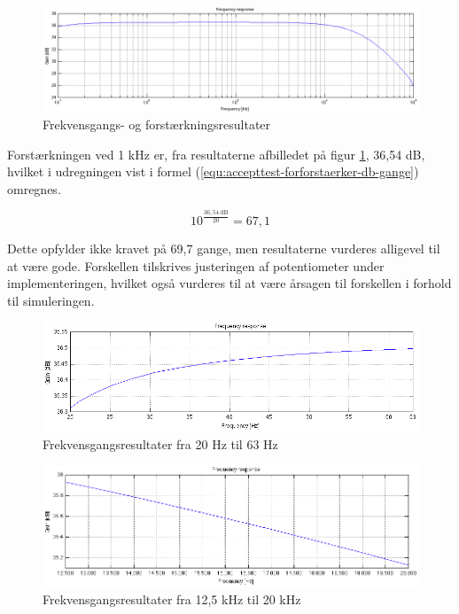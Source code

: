 \begin{figure}[h]
\centering
\includegraphics[width=\textwidth]{maalerapporter/forforstaerker/frekvensrespons-forforstaerker.png}
\caption{Frekvensgangs- og forstærkningsresultater}
\label{fig:accepttest-fresultat-forforstaerker}
\end{figure}

Forstærkningen ved 1 kHz er, fra resultaterne afbilledet på figur \ref{fig:accepttest-fresultat-forforstaerker}, 36,54 dB, hvilket i udregningen vist i formel (\ref{equ:accepttest-forforstaerker-db-gange}) omregnes.

\begin{equation}
\label{equ:accepttest-forforstaerker-db-gange}
10^{\frac{\mathrm{36,54~dB}}{20}} = 67,1
\end{equation}

Dette opfylder ikke kravet på 69,7 gange, men resultaterne vurderes alligevel til at være gode. Forskellen tilskrives justeringen af potentiometer under implementeringen, hvilket også vurderes til at være årsagen til forskellen i forhold til simuleringen. 

\begin{figure}[h]
\centering
\includegraphics[width=\textwidth]{maalerapporter/forforstaerker/fr20-63.png}
\caption{Frekvensgangsresultater fra 20 Hz til 63 Hz}
\label{fig:accepttest-fres-20-63}
\end{figure}

\begin{figure}[h]
\centering
\includegraphics[width=\textwidth]{maalerapporter/forforstaerker/fr12-20k.png}
\caption{Frekvensgangsresultater fra 12,5 kHz til 20 kHz}
\label{fig:accepttest-fres-125-20}
\end{figure}

